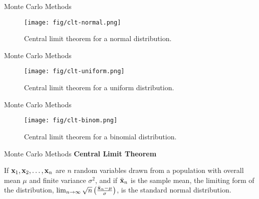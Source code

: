 \documentclass[10pt]{beamer}
\newcommand{\emphbox}[1]{%
\noindent\colorbox{shade}{%
\begin{minipage}{\dimexpr\linewidth-2\fboxsep}#1\end{minipage}}}
\begin{document}
\begin{frame}{Monte Carlo Methods}
\begin{figure}
\centering
  \texttt{[image: fig/clt-normal.png]}
  \caption{Central limit theorem for a normal distribution.}
\end{figure}
\end{frame}

\begin{frame}{Monte Carlo Methods}
\begin{figure}
\centering
  \texttt{[image: fig/clt-uniform.png]}
  \caption{Central limit theorem for a uniform distribution.}
\end{figure}
\end{frame}

\begin{frame}{Monte Carlo Methods}
\begin{figure}
\centering
  \texttt{[image: fig/clt-binom.png]}
  \caption{Central limit theorem for a binomial distribution.}
\end{figure}
\end{frame}

\begin{frame}{Monte Carlo Methods}
\textbf{Central Limit Theorem}\vspace{0.2cm}
\emphbox{%
If ${\bf x}_1, {\bf x}_2, \dots, {\bf x}_n$ are $n$ random variables drawn from a population with overall mean $\mu$ and finite variance $\sigma^2$, and if $\bar{{\bf x}}_n$ is the sample mean, the limiting form of the distribution, $\lim_{n \rightarrow \infty} \sqrt{n} \left( \frac{\bar{{\bf x}}_n - \mu}{\sigma} \right)$, is the standard normal distribution.}
\end{frame}
\end{document}
